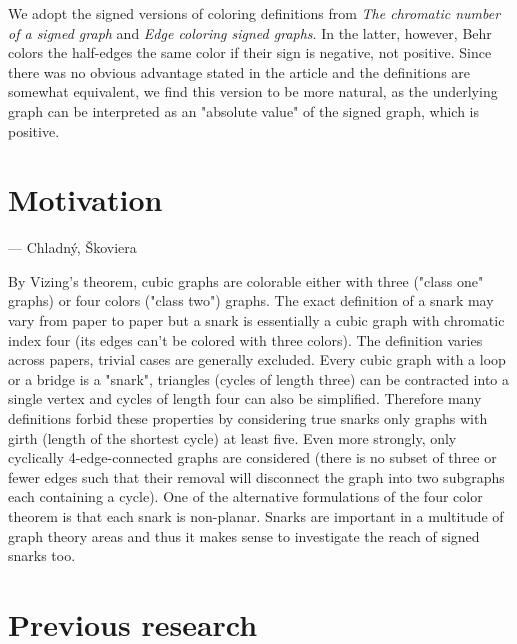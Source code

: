 We adopt the signed versions of coloring definitions from \textit{The chromatic number of a signed graph}\cite{chromatic-number} and \textit{Edge coloring signed graphs}\cite{behr-edge-coloring}. In the latter, however, Behr colors the half-edges the same color if their sign is negative, not positive. Since there was no obvious advantage stated in the article and the definitions are somewhat equivalent, we find this version to be more natural, as the underlying graph can be interpreted as an "absolute value" of the signed graph, which is positive.

\section{Motivation}

 --- Chladný, Škoviera \cite{skoviera-citat}

By Vizing's theorem, cubic graphs are colorable either with three ("class one" graphs) or four colors ("class two") graphs. The exact definition of a snark may vary from paper to paper but a snark is essentially a cubic graph with chromatic index four (its edges can't be colored with three colors). The definition varies across papers, trivial cases are generally excluded. Every cubic graph with a loop or a bridge is a "snark", triangles (cycles of length three) can be contracted into a single vertex and cycles of length four can also be simplified. Therefore many definitions forbid these properties by considering true snarks only graphs with girth (length of the shortest cycle) at least five. Even more strongly, only cyclically 4-edge-connected graphs are considered (there is no subset of three or fewer edges such that their removal will disconnect the graph into two subgraphs each containing a cycle). One of the alternative formulations of the four color theorem is that each snark is non-planar. Snarks are important in a multitude of graph theory areas and thus it makes sense to investigate the reach of signed snarks too.

\section{Previous research}

